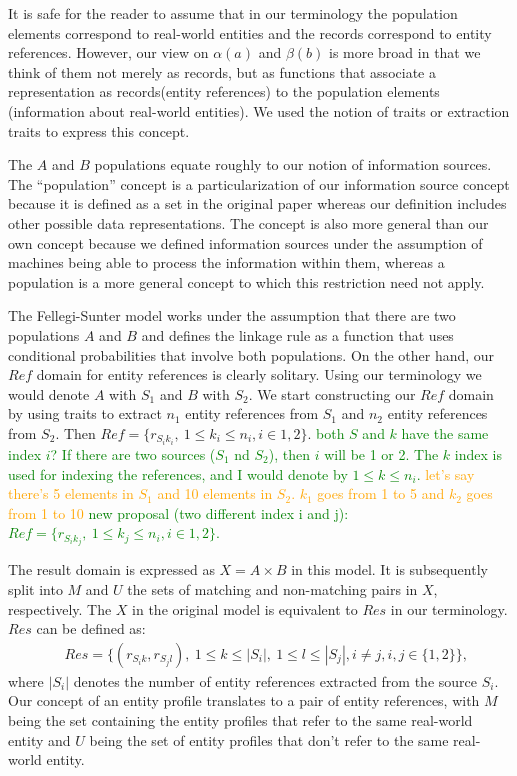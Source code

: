 \documentclass[11pt]{article}
\begin{document}
    It is safe for the reader to assume that in our terminology the population
    elements correspond to real-world entities and the records correspond to
    entity references.
    However, our view on $\alpha(a)$ and $\beta(b)$ is more broad in that we
    think of them not merely as records, but as functions that associate a
    representation as records(entity references) to the population elements
    (information about real-world entities).
    We used the notion of traits or extraction traits to express this concept.
        
    The $A$ and $B$ populations equate roughly to our notion of information
    sources.
    The ``population'' concept is a particularization of our information source
    concept because it is defined as a set in the original paper whereas our
    definition includes other possible data representations.
    The concept is also more general than our own concept because we defined
    information sources under the assumption of machines being able to process
    the information within them, whereas a population is a more general concept
    to which this restriction need not apply.

    The Fellegi-Sunter model works under the assumption that there are two
    populations $A$ and $B$ and defines the linkage rule as a function that uses
    conditional probabilities that involve both populations.
    On the other hand, our $Ref$ domain for entity references is clearly
    solitary.
    Using our terminology we would denote $A$ with $S_1$ and $B$ with $S_2$.
    We start constructing our $Ref$ domain by using traits to extract $n_1$
    entity references from $S_1$ and $n_2$ entity references from $S_2$.
    Then $Ref = \{r_{{S_i}{k_i}},~1 \leq k_i \leq n_i, i \in {1, 2} \}$.
    \textcolor{green}{both $S$ and $k$ have the same index $i$? If there are two sources ($S_1$ nd $S_2$), then $i$ will be 1 or 2. The $k$ index is used for indexing the references, and I would denote by $1 \leq k \leq n_i$.}
    \textcolor{orange}{let's say there's 5 elements in $S_1$ and 10 elements in
    $S_2$. $k_1$ goes from 1 to 5 and $k_2$ goes from 1 to 10}
    \textcolor{green}{new proposal (two different index i and j):  $Ref = \{r_{{S_i}{k_j}},~1 \leq k_j \leq n_i, i \in {1, 2} \}$.}
    
    The result domain is expressed as $X = A \times B$ in this model.
    It is subsequently split into $M$ and $U$ the sets of matching and
    non-matching pairs in $X$, respectively.
    The $X$ in the original model is equivalent to $Res$ in our terminology.
    $Res$ can be defined as:
    \begin{align}
        &Res = \{(r_{{S_i}{k}}, r_{{S_j}{l}}),~1 \leq k \leq |S_i|,~1
        \leq l \leq |S_j|, i \neq j, i,j \in \{1, 2\}\}\textrm{,}\nonumber
    \end{align}
    where $|S_i|$ denotes the number of entity references extracted from the
    source $S_i$.
    Our concept of an entity profile translates to a pair of entity references,
    with $M$ being the set containing the entity profiles that refer to the same
    real-world entity and $U$ being the set of entity profiles that don't refer
    to the same real-world entity.
\end{document}
